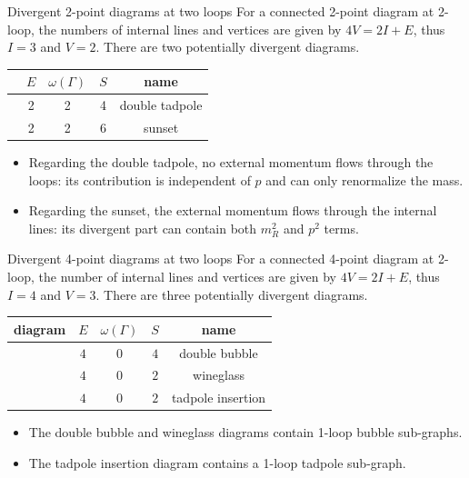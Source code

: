 \documentclass[aspectratio=169,10pt]{beamer}
\newcommand{\DoubleTadpoleDiagram}{
\begin{tikzpicture}[scale=0.7,transform shape,baseline={([yshift=-0.1cm]current bounding box.center)}]
\begin{feynman}
    \vertex (i) at (-1.8,0); 
    \vertex (f) at (1.8,0); 
    \vertex [dot] (v1) at (0,0) {}; 
    \vertex [dot] (v2) at (0,1.2) {}; 
    
    \diagram*{(i)--[scalar](v1)--[scalar](f),(v1)--[scalar,half left,looseness=1.4](v2),(v1)--[scalar,half right,looseness=1.4](v2)}; 
    
    \draw (v2) edge[scalar,loop above,out=140,in=40,min distance=1.3cm,looseness=4] (v2); 

\end{feynman}
\end{tikzpicture}
}
\newcommand{\SunsetDiagram}{
\begin{tikzpicture}[scale=0.7,transform shape,baseline={([yshift=-0.1cm]current bounding box.center)}]
\begin{feynman}
\vertex (i) at (-2,0); 
\vertex [dot] (v1) at (-0.8,0) {}; 
\vertex [dot] (v2) at (0.8,0) {}; 
\vertex (f) at (2,0); 

\diagram*{(i)--[scalar](v1),(v1)--[scalar](v2),(v1)--[scalar,half left,looseness=1.5](v2),(v1)--[scalar,half right,looseness=1.5](v2),(v2)--[scalar](f)}; 

\end{feynman}
\end{tikzpicture}
}
\newcommand{\FourPointDoubleBubble}{%
\begin{tikzpicture}[scale=0.7,transform shape,baseline={([yshift=-0.1cm]current bounding box.center)}]
    \begin{feynman}
        \vertex (i1) at (-1.8, 0.65);
        \vertex (i2) at (-1.8,-0.65);

        \vertex[dot] (L) at (-1,0) {};
        \vertex[dot] (C) at ( 0,0) {};
        \vertex[dot] (R) at ( 1,0) {};

        \vertex (f1) at (1.8, 0.65);
        \vertex (f2) at (1.8,-0.65);

        \diagram*{
            (i1) -- [scalar] (L),
            (i2) -- [scalar] (L),

            (L) -- [scalar, bend left=45]  (C),
            (L) -- [scalar, bend right=45] (C),

            (C) -- [scalar, bend left=45]  (R),
            (C) -- [scalar, bend right=45] (R),

            (R) -- [scalar] (f1),
            (R) -- [scalar] (f2)
        };
    \end{feynman}
\end{tikzpicture}%
}
\newcommand{\FourPointWineglass}{%
\begin{tikzpicture}[scale=0.7,transform shape,baseline={([yshift=-0.1cm]current bounding box.center)}]
    \begin{feynman}
        \vertex (i1) at (-1.7, 0.65);
        \vertex (i2) at (-1.7,-0.65);

        \vertex[dot] (A) at (-0.9, 0) {};
        \vertex[dot] (B) at ( 0.65, 0.55) {};
        \vertex[dot] (C) at ( 0.65,-0.55) {};

        \vertex (f1) at (1.55, 0.8);
        \vertex (f2) at (1.55,-0.8);

        \diagram*{
            (i1) -- [scalar] (A),
            (i2) -- [scalar] (A),

            (A) -- [scalar] (B),
            (A) -- [scalar] (C),

            (B) -- [scalar, bend left=25]  (C),
            (B) -- [scalar, bend right=25] (C),

            (B) -- [scalar] (f1),
            (C) -- [scalar] (f2)
        };
    \end{feynman}
\end{tikzpicture}%
}
\newcommand{\FourPointTadpoleInsertion}{%
\begin{tikzpicture}[scale=0.7,transform shape,baseline={([yshift=-0.1cm]current bounding box.center)}]
    \begin{feynman}
        \vertex (i1) at (-1.7, 0.65);
        \vertex (i2) at (-1.7,-0.65);

        \vertex[dot] (L) at (-0.9,0) {};
        \vertex[dot] (T) at (0,0.45) {};
        \vertex[dot] (R) at (0.9,0) {};

        \vertex (f1) at (1.7, 0.65);
        \vertex (f2) at (1.7,-0.65);

        \diagram*{
            (i1) -- [scalar] (L),
            (i2) -- [scalar] (L),

            (L) -- [scalar] (T),
            (T) -- [scalar] (R),
            (L) -- [scalar, bend right=45] (R),

            (R) -- [scalar] (f1),
            (R) -- [scalar] (f2)
        };

        \draw (T) edge[scalar, loop above, out=130, in=50, min distance=0.8cm, looseness=4] (T);
        
    \end{feynman}
\end{tikzpicture}%
}
\begin{document}
\begin{frame}{Divergent 2-point diagrams at two loops}
For a connected 2-point diagram at 2-loop, the numbers of internal lines and vertices are given by $4V = 2I + E$, thus $I = 3$ and $V = 2$. There are two potentially divergent diagrams.
\begin{table}[]
    \centering
    \begin{tabular}{|c|c|c|c|c|}
        \hline
         & $E$ & $\omega(\Gamma)$ & $S$ & name \\ \hline
         \DoubleTadpoleDiagram & 2 & 2 & 4 & double tadpole \\ 
         \SunsetDiagram & 2 & 2 & 6 & sunset \\ 
         \hline
    \end{tabular}
    \label{tab: 2-loop divergent graphs}
\end{table}
\begin{itemize}
    \item Regarding the double tadpole, no external momentum flows through the loops: its contribution is independent of $p$ and can only renormalize the mass.
    \item Regarding the sunset, the external momentum flows through the internal lines: its divergent part can contain both $m_R^2$ and $p^2$ terms.
\end{itemize}
\end{frame}

\begin{frame}{Divergent 4-point diagrams at two loops}
    For a connected 4-point diagram at 2-loop, the number of internal lines and vertices are given by $4V = 2I + E$, thus $I=4$ and $V=3$. There are three potentially divergent diagrams.
    \begin{table}
        \centering
        \begin{tabular}{|c|c|c|c|c|}
            \hline
            diagram & $E$ & $\omega(\Gamma)$ & $S$ & name \\
            \hline
            \FourPointDoubleBubble & $4$ & $0$ & $4$ & double bubble \\
            \FourPointWineglass & $4$ & $0$ & $2$ & wineglass \\
            \FourPointTadpoleInsertion & $4$ & $0$ & $2$ & tadpole insertion \\
            \hline
        \end{tabular}
    \end{table}
    \begin{itemize}
        \item The double bubble and wineglass diagrams contain 1-loop bubble sub-graphs.
        \item The tadpole insertion diagram contains a 1-loop tadpole sub-graph.
    \end{itemize}
\end{frame}
\end{document}

